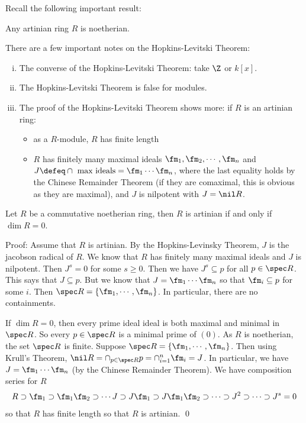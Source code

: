 Recall the following important result:

\begin{thmm}
Any artinian ring $R$ is noetherian. 
\end{thmm}

\begin{rem} There are a few important notes on the Hopkins-Levitski Theorem: 
\begin{enumerate}[(i)]
\item The converse of the Hopkins-Levitski Theorem: take $\Z$ or $k[x]$.
\item The Hopkins-Levitski Theorem is false for modules.
\item The proof of the Hopkins-Levitski Theorem shows more: if $R$ is an artinian ring:
\begin{itemize}
\item as a $R$-module, $R$ has finite length
\item $R$ has finitely many maximal ideals $\fm_1,\fm_2,\cdots,\fm_n$ and $J\defeq \cap \text{ max ideals}=\fm_1\cdots\fm_n$, where the last equality holds by the Chinese Remainder Theorem (if they are comaximal, this is obvious as they are maximal), and $J$ is nilpotent with $J=\nil R$. 
\end{itemize}
\end{enumerate}
\end{rem}

\begin{prop}
Let $R$ be a commutative noetherian ring, then $R$ is artinian if and only if $\dim R=0$.
\end{prop}

\noindent Proof: Assume that $R$ is artinian. By the Hopkins-Levinsky Theorem, $J$ is the jacobson radical of $R$. We know that $R$ has finitely many maximal ideals and $J$ is nilpotent. Then $J^s=0$ for some $s \geq 0$. Then we have $J^s \subseteq p$ for all $p \in \spec R$. This says that $J \subseteq p$. But we know that $J=\fm_1\cdots \fm_n$ so that $\fm_i \subseteq p$ for some $i$. Then $\spec R=\{\fm_1,\cdots,\fm_n\}$. In particular, there are no containments. 

If $\dim R=0$, then every prime ideal ideal is both maximal and minimal in $\spec R$. So every $p \in \spec R$ is a minimal prime of $(0)$. As $R$ is noetherian, the set $\spec R$ is finite. Suppose $\spec R=\{\fm_1,\cdots,\fm_n\}$. Then using Krull's Theorem, $\nil R=\cap_{p \in \spec R} p=\cap_{i=1}^n \fm_i=J$. In particular, we have $J=\fm_1\cdots\fm_n$ (by the Chinese Remainder Theorem). We have composition series for $R$
\[
R \supset \fm_1 \supset \fm_1 \fm_2 \supset \cdots J \supset J\fm_1 \supset J\fm_1\fm_2 \supset \cdots \supset J^2 \supset \cdots \supset J^s=0
\]
so that $R$ has finite length so that $R$ is artinian. \qed \\

